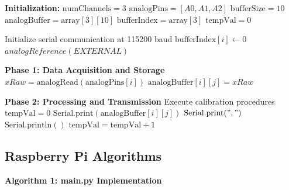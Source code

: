 \begin{algorithmic}[1]
	\STATE \textbf{Initialization:}
	\STATE $\text{numChannels} = 3$ 
	\STATE $\text{analogPins} = [A0, A1, A2]$ 
	\STATE $\text{bufferSize} = 10$ 
	\STATE $\text{analogBuffer} = \text{array}[3][10]$ 
	\STATE $\text{bufferIndex} = \text{array}[3]$ 
	\STATE $\text{tempVal} = 0$ 
	
	\STATE
	\STATE Initialize serial communication at 115200 baud
	\STATE $\text{bufferIndex}[i] \gets 0$ 
	\ENDFOR
	\STATE $analogReference(EXTERNAL)$
	
	
	\STATE
	\STATE \textbf{Phase 1: Data Acquisition and Storage}
	\STATE $xRaw =\text{analogRead}(\text{analogPins}[i])$
	\STATE $\text{analogBuffer}[i][j] = xRaw$
	\ENDFOR
	\ENDFOR
	
	\STATE
	\STATE \textbf{Phase 2: Processing and Transmission}
	\STATE Execute calibration procedures
	\STATE $\text{tempVal} = 0$
	\ELSE
	\STATE $\text{Serial.print}(\text{analogBuffer}[i][j])$
	\STATE $\text{Serial.print}(" , ")$
	\ENDIF
	\ENDFOR
	\STATE $\text{Serial.println}()$ 
	\ENDFOR
	\STATE $\text{tempVal} = \text{tempVal} + 1$
	\ENDIF
	\ENDWHILE
\end{algorithmic}

\clearpage 

\subsection{Raspberry Pi Algorithms}
\label{subsec:raspberrypi-algorithm}

\noindent\textbf{Algorithm 1: main.py Implementation}

